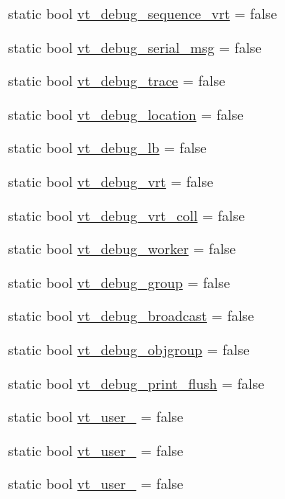 \begin{DoxyCompactItemize}
\item 
static bool \hyperlink{structvt_1_1arguments_1_1_arg_config_a8d2ad7c39aea97ec9679b3b660d8c017}{vt\+\_\+debug\+\_\+sequence\+\_\+vrt} = false
\item 
static bool \hyperlink{structvt_1_1arguments_1_1_arg_config_a8823380fec70a43d1179bcbbef969b1f}{vt\+\_\+debug\+\_\+serial\+\_\+msg} = false
\item 
static bool \hyperlink{structvt_1_1arguments_1_1_arg_config_a526c1e1f5819dd2296fed29673a14fbe}{vt\+\_\+debug\+\_\+trace} = false
\item 
static bool \hyperlink{structvt_1_1arguments_1_1_arg_config_a6aba4c0733b232a7bc1889e063185d75}{vt\+\_\+debug\+\_\+location} = false
\item 
static bool \hyperlink{structvt_1_1arguments_1_1_arg_config_a855ec23d7e91d2d7b6dc102c0e9f4b7a}{vt\+\_\+debug\+\_\+lb} = false
\item 
static bool \hyperlink{structvt_1_1arguments_1_1_arg_config_aa50afb2441de7797225ec882ae42ab73}{vt\+\_\+debug\+\_\+vrt} = false
\item 
static bool \hyperlink{structvt_1_1arguments_1_1_arg_config_ad5a4ae4f09e2cb77100e5622e2d5e690}{vt\+\_\+debug\+\_\+vrt\+\_\+coll} = false
\item 
static bool \hyperlink{structvt_1_1arguments_1_1_arg_config_a6386b3a1d890ff781a16546aefb6d642}{vt\+\_\+debug\+\_\+worker} = false
\item 
static bool \hyperlink{structvt_1_1arguments_1_1_arg_config_a858d2cf937f28c93c34d70ef30365664}{vt\+\_\+debug\+\_\+group} = false
\item 
static bool \hyperlink{structvt_1_1arguments_1_1_arg_config_a95bc48ba7cbf5bc30298d47633a15ea5}{vt\+\_\+debug\+\_\+broadcast} = false
\item 
static bool \hyperlink{structvt_1_1arguments_1_1_arg_config_aec0f3598cdf4a78b578a7ac8eaf6f0fc}{vt\+\_\+debug\+\_\+objgroup} = false
\item 
static bool \hyperlink{structvt_1_1arguments_1_1_arg_config_a33abd22d9a5b153b3915eea465ff93e2}{vt\+\_\+debug\+\_\+print\+\_\+flush} = false
\item 
static bool \hyperlink{structvt_1_1arguments_1_1_arg_config_ad4e433d0d0a5e9cbe39a1045194fff3b}{vt\+\_\+user\+\_} = false
\item 
static bool \hyperlink{structvt_1_1arguments_1_1_arg_config_a0c3fedfb03820032fc87969ff3eabd77}{vt\+\_\+user\+\_} = false
\item 
static bool \hyperlink{structvt_1_1arguments_1_1_arg_config_a91c4c1cdfab2def4254db74c705245f6}{vt\+\_\+user\+\_} = false

\end{DoxyCompactItemize}
